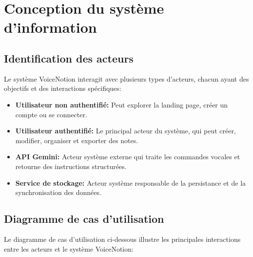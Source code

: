     \section{Conception du système d'information}
    
    \subsection{Identification des acteurs}
    
    Le système VoiceNotion interagit avec plusieurs types d'acteurs, chacun ayant des objectifs et des interactions spécifiques:
    
    \begin{itemize}
        \item \textbf{Utilisateur non authentifié:} Peut explorer la landing page, créer un compte ou se connecter.
        
        \item \textbf{Utilisateur authentifié:} Le principal acteur du système, qui peut créer, modifier, organiser et exporter des notes.
        
        \item \textbf{API Gemini:} Acteur système externe qui traite les commandes vocales et retourne des instructions structurées.
        
        \item \textbf{Service de stockage:} Acteur système responsable de la persistance et de la synchronisation des données.
    \end{itemize}
    
    \subsection{Diagramme de cas d'utilisation}
    
    Le diagramme de cas d'utilisation ci-dessous illustre les principales interactions entre les acteurs et le système VoiceNotion:
    
